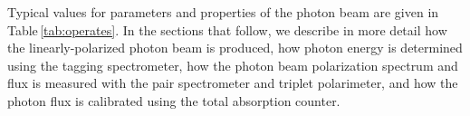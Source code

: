 Typical values for parameters and properties of the photon beam are given in Table\,\ref{tab:operates}.
In the sections that follow, we describe in more detail how the linearly-polarized photon beam
is produced, how photon energy is determined using the tagging spectrometer, how the photon beam polarization
spectrum and flux is measured with the pair spectrometer and triplet polarimeter, and how the photon
flux is calibrated using the total absorption counter.

\begin{table}[btp]
\begin{center}
\caption[Typical parameters for the \GX{} photon beam]{\label{tab:operates}
Typical parameters for the \GX{} photon beam,
consistent with the electron beam properties listed in Table \ref{tab:elecprop},
a diamond radiator of thickness 50~$\mu$m, and the standard primary collimator of diameter 5.0~mm
located at the nominal position. The electron beam current incident on the radiator is taken to  be $150$~nA.
The hadronic rates are calculated for the \GX{} 30~cm liquid hydrogen target.}


\end{center}
\end{table}
